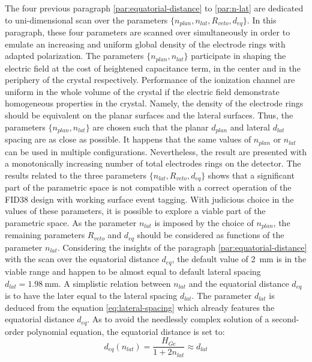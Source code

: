 The four previous paragraph \ref{par:equatorial-distance} to \ref{par:n-lat} are dedicated to uni-dimensional scan over the parameters $\{n_{plan}, n_{lat}, R_{veto}, d_{eq}\}$. In this paragraph, these four parameters are scanned over simultaneously in order to emulate an increasing and uniform global density of the electrode rings with adapted polarization.
The parameters $\{n_{plan}, n_{lat} \}$ participate in shaping the electric field at the cost of heightened capacitance term, in the center and in the periphery of the crystal respectively. Performance of the ionization channel are uniform in the whole volume of the crystal if the electric field demonstrate homogeneous properties in the crystal. Namely, the density of the electrode rings should be equivalent on the planar surfaces and the lateral surfaces. Thus, the parameters $\{n_{plan}, n_{lat} \}$ are chosen such that the planar $d_{plan}$ and lateral $d_{lat}$ spacing are as close as possible. It happens that the same values of $n_{plan}$ or $n_{lat}$ can be used in multiple configurations. Nevertheless, the result are presented with a monotonically increasing number of total electrodes rings on the detector.
The results related to the three parameters $\{n_{lat}, R_{veto}, d_{eq}\}$ shows that a significant part of the parametric space is not compatible with a correct operation of the FID38 design with working surface event tagging. With judicious choice in the values of these parameters, it is possible to explore a viable part of the parametric space. As the parameter $n_{lat}$ is imposed by the choice of $n_{plan}$, the remaining parameters $R_{veto}$ and $d_{eq}$ should be considered as functions of the parameter $n_{lat}$. Considering the insights of the paragraph \ref{par:equatorial-distance} with the scan over the equatorial distance $d_{eq}$, the default value of \SI{2}{\mm} is in the viable range and happen to be almost equal to default lateral spacing $d_{lat} = \SI{1.98}{\mm}$. A simplistic relation between $n_{lat}$ and the equatorial distance $d_{eq}$ is to have the later equal to the lateral spacing $d_{lat}$. The parameter $d_{lat}$ is deduced from the equation \ref{eq:lateral-spacing} which already features the equatorial distance $d_{eq}$. As to avoid the needlessly complex solution of a second-order polynomial equation, the equatorial distance is set to:
\begin{equation}
d_{eq} \left( n_{lat} \right) = \frac{H_{Ge}}{1 + 2 n_{lat}} \approx d_{lat}
\end{equation}
